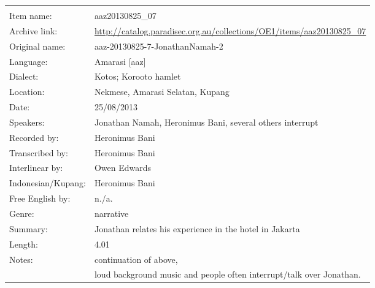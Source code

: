\newpage
\noindent
\wg\begin{tabular}{lL{.67\textwidth}}
			& \\
Item name:			& aaz20130825{\_}07\\
Archive link:			& \url{http://catalog.paradisec.org.au/collections/OE1/items/aaz20130825_07}\\
Original name:			& aaz-20130825-7-JonathanNamah-2\\
Language:				& Amarasi [aaz] \\
Dialect:				& Kotos; Koro{\Q}oto hamlet \\
Location:				& Nekmese{\Q}, Amarasi Selatan, Kupang \\
Date:				& 25/08/2013\\
Speakers:				& Jonathan Namah, Heronimus Bani, several others interrupt \\
Recorded by:			& Heronimus Bani\\
Transcribed by:		& Heronimus Bani\\
Interlinear by:		& Owen Edwards \\
Indonesian/Kupang:		& Heronimus Bani\\
Free English by:		& n./a.\\
Genre:				& narrative\\
Summary:				& Jonathan relates his experience in the hotel in Jakarta\\
Length:				& 4.01\\
Notes:				& continuation of  above, \\
					& loud background music and people often interrupt/talk over Jonathan. \\
\end{tabular}

